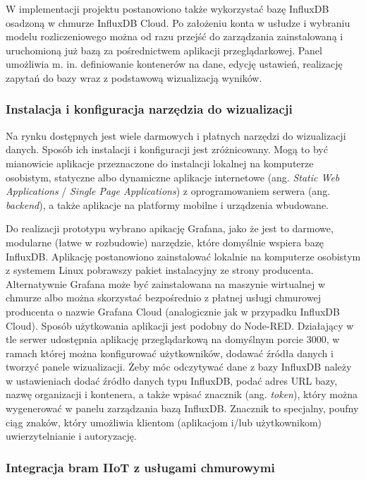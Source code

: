 \documentclass[a4paper, 12pt, twoside]{article}
\begin{document}
W implementacji projektu postanowiono także wykorzystać bazę InfluxDB 
osadzoną w chmurze InfluxDB Cloud. Po założeniu konta w usłudze i wybraniu
modelu rozliczeniowego można od razu przejść do zarządzania zainstalowaną
i uruchomioną już bazą za pośrednictwem aplikacji przeglądarkowej. Panel 
umożliwia m. in. definiowanie kontenerów na dane, edycję ustawień, 
realizację zapytań do bazy wraz z podstawową wizualizacją wyników. 


\subsubsection{Instalacja i konfiguracja narzędzia do wizualizacji}\label{grafana-conf}

Na rynku dostępnych jest wiele darmowych i płatnych narzędzi do wizualizacji danych.
Sposób ich instalacji i konfiguracji jest zróżnicowany. Mogą to być mianowicie
aplikacje przeznaczone do instalacji lokalnej na komputerze osobistym,
statyczne albo dynamiczne aplikacje internetowe (ang. \emph{Static Web Applications} / \emph{Single Page Applications})
z oprogramowaniem serwera (ang. \emph{backend}), a także
aplikacje na platformy mobilne i urządzenia wbudowane.

Do realizacji prototypu wybrano apikację Grafana, jako że jest to darmowe,
modularne (łatwe w rozbudowie) narzędzie, które domyślnie wspiera
bazę InfluxDB. Aplikację postanowiono zainstalować lokalnie na komputerze osobistym
z systemem Linux pobrawszy pakiet instalacyjny ze strony producenta. 
Alternatywnie Grafana może być zainstalowana na maszynie wirtualnej w 
chmurze albo można skorzystać bezpośrednio z płatnej usługi chmurowej producenta 
o nazwie Grafana Cloud (analogicznie jak w przypadku InfluxDB Cloud).
Sposób użytkowania aplikacji jest podobny do Node-RED. Działający w tle
serwer udostępnia aplikację przeglądarkową na domyślnym porcie 3000, w ramach której
można konfigurować użytkowników, dodawać źródła danych i tworzyć panele wizualizacji.
Żeby móc odczytywać dane z bazy InfluxDB należy w ustawieniach dodać źródło danych
typu InfluxDB, podać adres URL bazy, nazwę organizacji i kontenera, a także wpisać
znacznik (ang. \emph{token}), który można wygenerować w panelu
zarządzania bazą InfluxDB. Znacznik to specjalny, poufny ciąg znaków, który 
umożliwia klientom (aplikacjom i/lub użytkownikom) uwierzytelnianie i autoryzację.


\subsubsection{Integracja bram IIoT z usługami chmurowymi}
\end{document}
